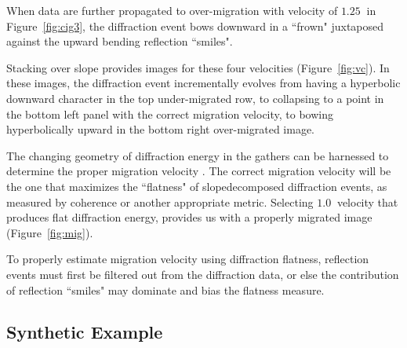 \par
When data are further propagated to over-migration with velocity of $1.25\ $\old{$[km/s]$} in Figure~\ref{fig:cig3},
the diffraction event bows downward in a ``frown" juxtaposed against the upward bending reflection ``smiles".
\par
Stacking over slope provides images for these four velocities (Figure~\ref{fig:vc}).
In these images, the diffraction event incrementally evolves from having a hyperbolic downward character in the top under-migrated row, to collapsing to a point in the bottom left panel with the correct migration velocity, to bowing hyperbolically upward in the bottom right over-migrated image.
\par
The changing geometry of diffraction energy
in the gathers can be harnessed to determine the proper migration velocity \cite[]{landa08,reshef09}.
The correct migration velocity will be the one that maximizes the ``flatness" of
slope\new{ }\old{-}decomposed diffraction events, as measured by coherence or another appropriate metric.
Selecting $1.0\ $\old{$[km/s]$} velocity that produces flat diffraction energy,
provides us with a properly migrated image (Figure~\ref{fig:mig}).
\par
To properly estimate migration velocity using diffraction flatness,
reflection events must first be filtered out from the diffraction data,
or else the contribution of reflection ``smiles" may dominate and bias the flatness measure.









\subsection{Synthetic Example}

